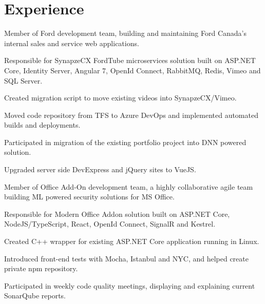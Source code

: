 \documentclass[letterpaper]{deedy-resume} %
\begin{document}
\begin{minipage}[t]{0.66\textwidth} %


\section{Experience}


\vspace{\topsep} %
\begin{tightitemize}
\item Member of Ford development team, building and maintaining Ford Canada's internal sales and service web applications.
\item Responsible for SynapzeCX FordTube microservices solution built on ASP.NET Core, Identity Server, Angular 7, OpenId Connect, RabbitMQ, Redis, Vimeo and SQL Server.
\item Created migration script to move existing videos into SynapzeCX/Vimeo.
\item Moved code repository from TFS to Azure DevOps and implemented automated builds and deployments.
\item Participated in migration of the existing portfolio project into DNN powered solution.
\item Upgraded server side DevExpress and jQuery sites to VueJS.
\end{tightitemize}

\sectionspace %



\vspace{\topsep} %
\begin{tightitemize}
\item Member of Office Add-On development team, a highly collaborative agile team building ML powered security solutions for MS Office.
\item Responsible for Modern Office Addon solution built on ASP.NET Core, NodeJS/TypeScript, React, OpenId Connect, SignalR and Kestrel.
\item Created C++ wrapper for existing ASP.NET Core application running in Linux.
\item Introduced front-end tests with Mocha, Istanbul and NYC, and helped create private npm repository.
\item Participated in weekly code quality meetings, displaying and explaining current SonarQube reports.
\end{tightitemize}


\end{minipage}
\end{document}
